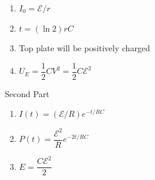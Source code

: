 \documentclass[10pt]{examdesign}
\begin{document}
\begin{shortanswer}[title={Free Response (15 pts)},rearrange=no,resetcounter=no]
\begin{question}
\begin{answer}
				\begin{enumerate}
					\item $ I_0 = \mathcal{E}/r $
					\item $ t = (\ln 2)rC $
					\item Top plate will be positively charged
					\item $ U_E = \dfrac{1}{2} CV^2 = \dfrac{1}{2}C \mathcal{E} ^2$
				\end{enumerate}
				Second Part
				\begin{enumerate}
					\item $ I(t) = (\mathcal{E}/R)e^{-t/RC} $
					\item $ P(t) = \dfrac{\mathcal{E}^2}{R} e^{-2t/RC}$
					\item $ E = \dfrac{C \mathcal{E}^2}{2} $
				\end{enumerate}
			\end{answer}
		\end{question}
	\end{shortanswer}
\end{document}
